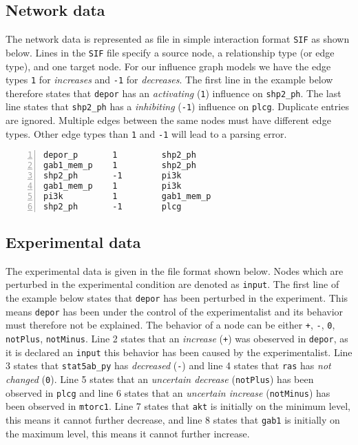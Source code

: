 \documentclass{article}
\begin{document}
\subsection{Network data}

The network data is represented as file in simple interaction format \texttt{SIF} as shown below.
Lines in the \texttt{SIF} file specify a source node, a relationship type (or edge type), and one target node.
For our influence graph models we have the edge types 
\texttt{1} for \emph{increases} 
and \texttt{-1} for \emph{decreases}.
The first line in the example below therefore states that
 \texttt{depor} has an \emph{activating} (\texttt{1}) influence on \texttt{shp2\_ph}.
The last line states that  \texttt{shp2\_ph} has a \emph{inhibiting} (\texttt{-1}) influence on \texttt{plcg}.
Duplicate entries are ignored. 
Multiple edges between the same nodes must have different edge types. 
Other edge types than \texttt{1} and \texttt{-1} will lead to a parsing error.

\begin{Verbatim}[frame=single,numbers=left]
depor_p       1         shp2_ph
gab1_mem_p    1         shp2_ph
shp2_ph       -1        pi3k
gab1_mem_p    1         pi3k
pi3k          1         gab1_mem_p
shp2_ph       -1        plcg
\end{Verbatim} 


\subsection{Experimental data}

The experimental data is given in the file format shown below.
Nodes which are perturbed in the experimental condition are denoted as \texttt{input}.
The first line of the example below states that \texttt{depor} has been perturbed in the experiment.
This means \texttt{depor} has been under the control of the experimentalist 
 and its behavior must therefore not be explained.
The behavior of a node can be either \texttt{+}, \texttt{-}, \texttt{0}, \texttt{notPlus}, \texttt{notMinus}.
Line 2 states that an \emph{increase} (\texttt{+}) was obeserved in \texttt{depor},
 as it is declared an \texttt{input} this behavior has been caused by the experimentalist.
Line 3 states that \texttt{stat5ab\_py} has \emph{decreased} (\texttt{-}) and
line 4 states that \texttt{ras} has \emph{not changed} (\texttt{0}).
Line 5 states that an \emph{uncertain decrease} (\texttt{notPlus}) has been observed in \texttt{plcg} and
line 6 states that an \emph{uncertain increase} (\texttt{notMinus}) has been observed in \texttt{mtorc1}.
Line 7 states that \texttt{akt} is initially on the minimum level, this means it cannot further decrease, and
line 8 states that \texttt{gab1} is initially on the maximum level, this means it cannot further increase.
\end{document}
